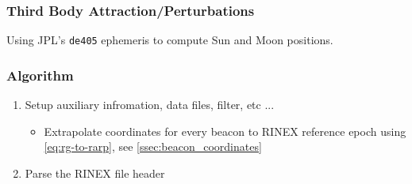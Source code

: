 \subsubsection{Third Body Attraction/Perturbations}
Using JPL's \texttt{de405} ephemeris to compute Sun and Moon positions.

\subsubsection{Algorithm}
\begin{enumerate}
  \item Setup auxiliary infromation, data files, filter, etc ...
  \begin{itemize}
    \item Extrapolate coordinates for every beacon to RINEX reference epoch using \ref{eq:rg-to-rarp}, see \ref{ssec:beacon_coordinates}
  \end{itemize}

  \item Parse the RINEX file header


\end{enumerate}
